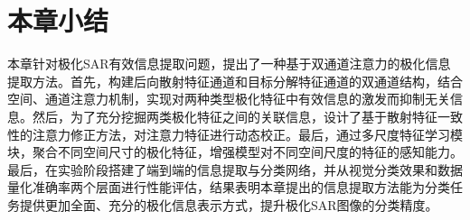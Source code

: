 \section{本章小结}
本章针对极化SAR有效信息提取问题，提出了一种基于双通道注意力的极化信息提取方法。首先，构建后向散射特征通道和目标分解特征通道的双通道结构，结合空间、通道注意力机制，实现对两种类型极化特征中有效信息的激发而抑制无关信息。然后，为了充分挖掘两类极化特征之间的关联信息，设计了基于散射特征一致性的注意力修正方法，对注意力特征进行动态校正。最后，通过多尺度特征学习模块，聚合不同空间尺寸的极化特征，增强模型对不同空间尺度的特征的感知能力。最后，在实验阶段搭建了端到端的信息提取与分类网络，并从视觉分类效果和数据量化准确率两个层面进行性能评估，结果表明本章提出的信息提取方法能为分类任务提供更加全面、充分的极化信息表示方式，提升极化SAR图像的分类精度。